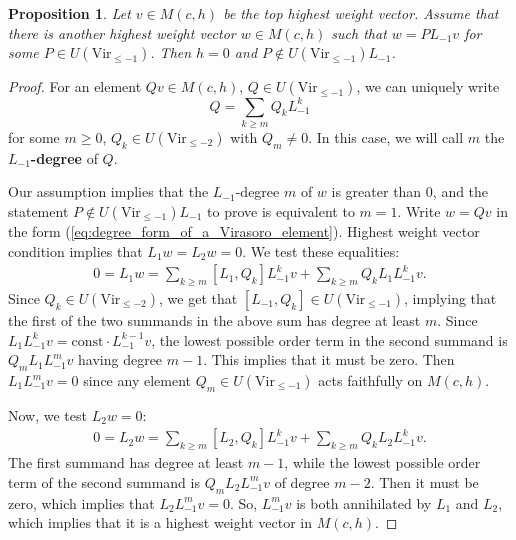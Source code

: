 \documentclass[11pt]{amsart}
\renewcommand{\le}{\leqslant}
\renewcommand{\ge}{\geqslant}
\newcommand{\Vir}{\mathrm{Vir}}
\numberwithin{equation}{section}
\theoremstyle{plain}
\newtheorem{proposition}[theorem]{Proposition}
\theoremstyle{definition}
\begin{document}
\begin{proposition}\label{p:highest_weight_containing_L_-1}
    Let $v\in M(c,h)$ be the top highest weight vector. Assume that there is another highest weight vector $w\in M(c,h)$ such that $w=PL_{-1}v$ for some $P\in U(\Vir_{\le -1})$. Then $h=0$ and $P\notin  U(\Vir_{\le -1})L_{-1}$.
\end{proposition}
\begin{proof}
    For an element $Qv\in M(c,h)$, $Q\in U(\Vir_{\le -1})$, we can uniquely write
    \begin{equation}\label{eq:degree_form_of_a_Virasoro_element}
        Q=\sum_{k\ge m}Q_kL_{-1}^k
    \end{equation}
    for some $m\ge 0$, $Q_k\in U(\Vir_{\le -2})$ with $Q_m\ne 0$. In this case, we will call $m$ the {\bfseries $L_{-1}$-degree} of $Q$.
    
    Our assumption implies that the $L_{-1}$-degree $m$ of $w$ is greater than $0$, and the statement $P\notin  U(\Vir_{\le -1})L_{-1}$ to prove is equivalent to $m=1$. Write $w=Qv$ in the form (\ref{eq:degree_form_of_a_Virasoro_element}). Highest weight vector condition implies that $L_{1}w=L_{2}w=0$. We test these equalities:
    \begin{align*}
        0=L_1w=\sum_{k\ge m}[L_{1},Q_k]L_{-1}^kv+\sum_{k\ge m}Q_kL_1L_{-1}^kv.
    \end{align*}
    Since $Q_k\in U(\Vir_{\le -2})$, we get that $[L_{-1},Q_k]\in U(\Vir_{\le -1})$, implying that the first of the two summands in the above sum has degree at least $m$. Since $L_1L_{-1}^kv=\mathrm{const}\cdot L_{-1}^{k-1}v$, the lowest possible order term in the second summand is $Q_mL_1L_{-1}^mv$ having degree $m-1$. This implies that it must be zero. Then $L_1L_{-1}^mv=0$ since any element $Q_m\in U(\Vir_{\le -1})$ acts faithfully on $M(c,h)$.

    Now, we test $L_2w=0$:
    \begin{align*}
        0=L_2w=\sum_{k\ge m}[L_{2},Q_k]L_{-1}^kv+\sum_{k\ge m}Q_kL_2L_{-1}^kv.
    \end{align*}
    The first summand has degree at least $m-1$, while the lowest possible order term of the second summand is $Q_mL_2L_{-1}^mv$ of degree $m-2$. Then it must be zero, which implies that $L_2L_{-1}^mv=0$. So, $L_{-1}^mv$ is both annihilated by $L_1$ and $L_2$, which implies that it is a highest weight vector in $M(c,h)$.


\end{proof}
\end{document}
